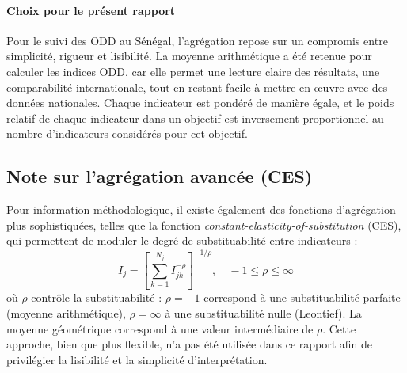 \paragraph{Choix pour le présent rapport}  
Pour le suivi des ODD au Sénégal, l’agrégation repose sur un compromis entre simplicité, rigueur et lisibilité. La moyenne arithmétique a été retenue pour calculer les indices ODD, car elle permet une lecture claire des résultats, une comparabilité internationale, tout en restant facile à mettre en œuvre avec des données nationales. Chaque indicateur est pondéré de manière égale, et le poids relatif de chaque indicateur dans un objectif est inversement proportionnel au nombre d’indicateurs considérés pour cet objectif.





\subsection*{Note sur l’agrégation avancée (CES)}  
Pour information méthodologique, il existe également des fonctions d’agrégation plus sophistiquées, telles que la fonction \textit{constant-elasticity-of-substitution} (CES), qui permettent de moduler le degré de substituabilité entre indicateurs :
\begin{equation}
I_j = \left[ \sum_{k=1}^{N_j} I_{jk}^{-\rho} \right]^{-1/\rho}, \quad -1 \leq \rho \leq \infty
\end{equation}
où $\rho$ contrôle la substituabilité : $\rho=-1$ correspond à une substituabilité parfaite (moyenne arithmétique), $\rho=\infty$ à une substituabilité nulle (Leontief). La moyenne géométrique correspond à une valeur intermédiaire de $\rho$. Cette approche, bien que plus flexible, n’a pas été utilisée dans ce rapport afin de privilégier la lisibilité et la simplicité d’interprétation.

